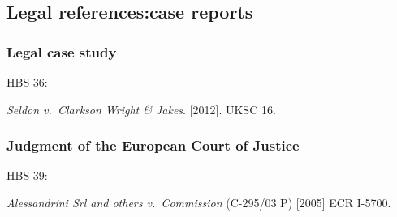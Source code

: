 \subsection{Legal references:\@ case reports}

\subsubsection*{Legal case study}

HBS 36: \cite{seldon-v-c.w.j2012}

\emph{Seldon v.~Clarkson Wright \& Jakes}. [2012]. UKSC 16.



\subsubsection*{Judgment of the European Court of Justice}

HBS 39: \cite{srl.etal-v-comm2005}

\emph{Alessandrini Srl and others v.~Commission} (C-295/03 P) [2005] ECR I-5700.



